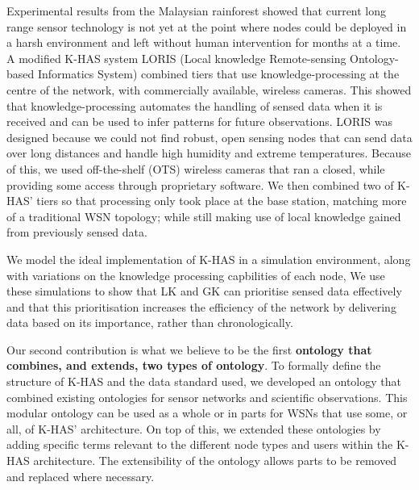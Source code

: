 Experimental results from the Malaysian rainforest showed that current long range sensor technology is not yet at the point where nodes could be deployed in a harsh environment and left without human intervention for months at a time. A modified K-HAS system LORIS (Local knowledge Remote-sensing Ontology-based Informatics System) combined tiers that use knowledge-processing at the centre of the network, with commercially available, wireless cameras. This showed that knowledge-processing automates the handling of sensed data when it is received and can be used to infer patterns for future observations. LORIS was designed because we could not find robust, open sensing nodes that can send data over long distances and handle high humidity and extreme temperatures. Because of this, we used off-the-shelf (OTS) wireless cameras that ran a closed, while providing some access through proprietary software. We then combined two of K-HAS' tiers so that processing only took place at the base station, matching more of a traditional WSN topology; while still making use of local knowledge gained from previously sensed data.

We model the ideal implementation of K-HAS in a simulation environment, along with variations on the knowledge processing capbilities of each node, We use these simulations to show that LK and GK can prioritise sensed data effectively and that this prioritisation increases the efficiency of the network by delivering data based on its importance, rather than chronologically.

Our second contribution is what we believe to be the first \textbf{ontology that combines, and extends,  two types of ontology}. To formally define the structure of K-HAS and the data standard used, we developed an ontology that combined existing ontologies for sensor networks and scientific observations. This modular ontology can be used as a whole or in parts for WSNs that use some, or all, of K-HAS' architecture. On top of this, we extended these ontologies by adding specific terms relevant to the different node types and users within the K-HAS architecture. The extensibility of the ontology allows parts to be removed and replaced where necessary.



